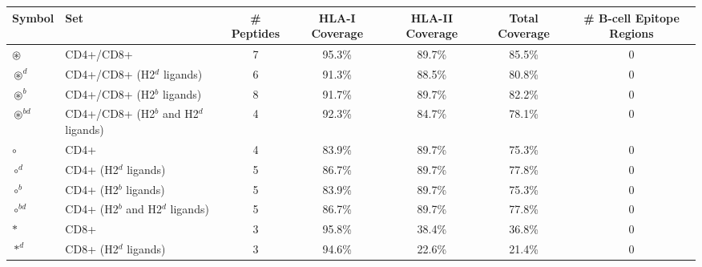 \begin{tabular}{llccccc}
\toprule
                                              Symbol &                                      Set &  \# Peptides & HLA-I Coverage & HLA-II Coverage & Total Coverage &  \# B-cell Epitope Regions \\
\midrule
                                     $ \circledast $ &                                CD4+/CD8+ &            7 &         95.3\% &          89.7\% &         85.5\% &                          0 \\
                                   $ \circledast^d $ &               CD4+/CD8+ (H2$^d$ ligands) &            6 &         91.3\% &          88.5\% &         80.8\% &                          0 \\
                                   $ \circledast^b $ &               CD4+/CD8+ (H2$^b$ ligands) &            8 &         91.7\% &          89.7\% &         82.2\% &                          0 \\
                                $ \circledast^{bd} $ &    CD4+/CD8+ (H2$^b$ and H2$^d$ ligands) &            4 &         92.3\% &          84.7\% &         78.1\% &                          0 \\
                                           $ \circ $ &                                     CD4+ &            4 &         83.9\% &          89.7\% &         75.3\% &                          0 \\
                                         $ \circ^d $ &                    CD4+ (H2$^d$ ligands) &            5 &         86.7\% &          89.7\% &         77.8\% &                          0 \\
                                         $ \circ^b $ &                    CD4+ (H2$^b$ ligands) &            5 &         83.9\% &          89.7\% &         75.3\% &                          0 \\
                                      $ \circ^{bd} $ &         CD4+ (H2$^b$ and H2$^d$ ligands) &            5 &         86.7\% &          89.7\% &         77.8\% &                          0 \\
                                            $ \ast $ &                                     CD8+ &            3 &         95.8\% &          38.4\% &         36.8\% &                          0 \\
                                          $ \ast^d $ &                    CD8+ (H2$^d$ ligands) &            3 &         94.6\% &          22.6\% &         21.4\% &                          0 \\

\end{tabular}
